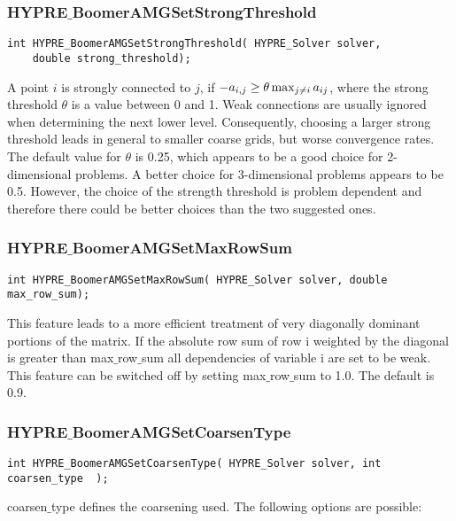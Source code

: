 \subsubsection*{HYPRE$\_$BoomerAMGSetStrongThreshold}
\begin{display}
\begin{verbatim}
int HYPRE_BoomerAMGSetStrongThreshold( HYPRE_Solver solver,
	double strong_threshold);
\end{verbatim}
\end{display}
A point $i$ is strongly connected to $j$, if $-a_{i,j} \geq \theta 
\max_{j \neq i} \-a_{ij}$, where the strong threshold $\theta$ is a value
between 0 and 1. Weak connections are usually ignored when determining
the next lower level. Consequently, choosing a larger strong threshold
leads in general to smaller coarse grids, but worse convergence rates.
The default value for $\theta$
is 0.25, which appears to be a good choice for 2-dimensional
problems. A better choice for 3-dimensional problems appears to be 0.5. However,
the choice of the strength threshold is problem dependent and therefore
there could be better choices than the two suggested ones.

\subsubsection*{HYPRE$\_$BoomerAMGSetMaxRowSum}
\begin{display}
\begin{verbatim}
int HYPRE_BoomerAMGSetMaxRowSum( HYPRE_Solver solver, double max_row_sum);
\end{verbatim}
\end{display}
This feature leads to a more efficient treatment of very
diagonally dominant portions of the matrix.
If the absolute row sum of row i weighted by the diagonal
is greater than max$\_$row$\_$sum all dependencies of variable i are set
to be weak. 
This feature can be switched off by setting max$\_$row$\_$sum to 1.0.
The default is 0.9.

\subsubsection*{HYPRE$\_$BoomerAMGSetCoarsenType}
\begin{display}
\begin{verbatim}
int HYPRE_BoomerAMGSetCoarsenType( HYPRE_Solver solver, int coarsen_type  );
\end{verbatim}
\end{display}
coarsen$\_$type defines the coarsening used. The following options 
are possible:

